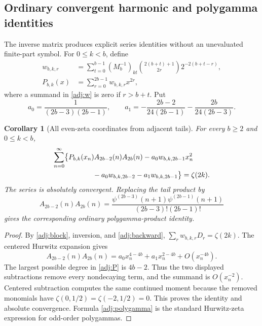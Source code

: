 \documentclass[11pt,a4paper]{article}
\numberwithin{equation}{section}
\newtheorem{corollary}[theorem]{Corollary}
\theoremstyle{definition}
\theoremstyle{remark}
\begin{document}
\subsection{Ordinary convergent harmonic and polygamma identities}

The inverse matrix produces explicit series identities without an
unevaluated finite-part symbol.  For $0\le k<b$, define
\begin{align}
 w_{b,k,r}
 &=\sum_{t=0}^{b-1}(M_b^{-1})_{kt}
 \binom{2(b+t)+1}{2r}2^{-2(b+t-r)},
 \label{adj:w}\\
 P_{b,k}(x)&=\sum_{r=0}^{2b-1}w_{b,k,r}x^{2r},
 \label{adj:P}
\end{align}
where a summand in \eqref{adj:w} is zero if $r>b+t$.  Put
\begin{equation}\label{adj:alpha}
 a_0=\frac1{(2b-3)(2b-1)},\qquad
 a_1=-\frac{2b-2}{24(2b-1)}-\frac{2b}{24(2b-3)}.
\end{equation}

\begin{corollary}[All even-zeta coordinates from adjacent tails]
\label{adj:ordinary}
For every $b\ge2$ and $0\le k<b$,
\begin{equation}\label{adj:ordinary-family}
 \begin{split}
 \sum_{n=0}^{\infty}\bigl\{&P_{b,k}(x_n)A_{2b-2}(n)A_{2b}(n)
       -a_0w_{b,k,2b-1}x_n^2\\
 &\hspace{12mm}-a_0w_{b,k,2b-2}-a_1w_{b,k,2b-1}\bigr\}
 =\zeta(2k).
 \end{split}
\end{equation}
The series is absolutely convergent.  Replacing the tail product by
\begin{equation}\label{adj:polygamma}
 A_{2b-2}(n)A_{2b}(n)
 =\frac{\psi^{(2b-3)}(n+1)\psi^{(2b-1)}(n+1)}
 {(2b-3)!(2b-1)!}
\end{equation}
gives the corresponding ordinary polygamma-product identity.
\end{corollary}

\begin{proof}
By \eqref{adj:block}, inversion, and \eqref{adj:backward},
$\sum_rw_{b,k,r}D_r=\zeta(2k)$.  The centered Hurwitz
expansion gives
\[
 A_{2b-2}(n)A_{2b}(n)
 =a_0x_n^{4-4b}+a_1x_n^{2-4b}+O(x_n^{-4b}).
\]
The largest possible degree in \eqref{adj:P} is $4b-2$.
Thus the two displayed subtractions remove every nondecaying term,
and the summand is $O(x_n^{-2})$.  Centered subtraction computes
the same continued moment because the removed monomials have
$\zeta(0,1/2)=\zeta(-2,1/2)=0$.  This proves the identity and
absolute convergence.  Formula \eqref{adj:polygamma} is the
standard Hurwitz-zeta expression for odd-order polygammas.
\end{proof}
\end{document}
